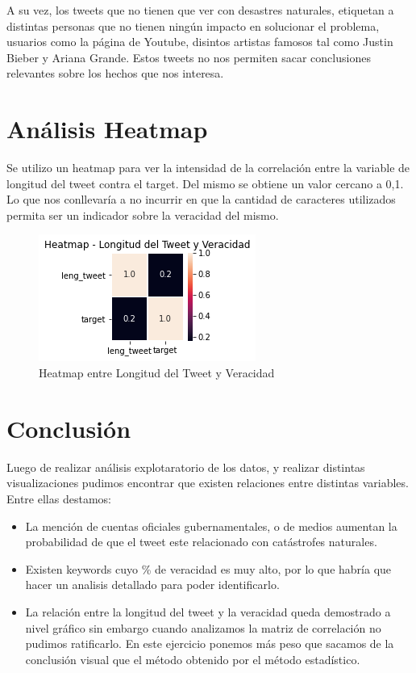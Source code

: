 \documentclass[]{article}
\begin{document}
A su vez, los tweets que no tienen que ver con desastres naturales, etiquetan a distintas personas que no tienen ning\'un impacto en solucionar el problema, usuarios como la p\'agina de Youtube, disintos artistas famosos tal como Justin Bieber y Ariana Grande. Estos tweets no nos permiten sacar conclusiones relevantes sobre los hechos que nos interesa.

\section{An\'alisis Heatmap}

Se utilizo un heatmap para ver la intensidad de la correlación entre la variable  de longitud del tweet contra el target. Del mismo se obtiene un valor cercano a 0,1. Lo que nos conllevaría a no incurrir en que la cantidad de caracteres utilizados permita ser un indicador sobre la veracidad del mismo.

 \begin{figure}[H]
	
	\includegraphics[width=0.70\linewidth]{heatmap}
	\caption[]{Heatmap entre Longitud del Tweet y Veracidad}
\end{figure}

\section{Conclusi\'on}

Luego de realizar an\'alisis explotaratorio de los datos, y realizar distintas visualizaciones pudimos encontrar que existen relaciones entre distintas variables. Entre ellas destamos:
\begin{itemize}
	\item La menci\'on de cuentas oficiales gubernamentales, o de medios aumentan la probabilidad de que el tweet este relacionado con cat\'astrofes naturales.
	\item Existen keywords cuyo \% de veracidad es muy alto, por lo que habr\'ia que hacer un analisis detallado para poder identificarlo. 
	\item La relaci\'on entre la longitud del tweet y la veracidad queda demostrado a nivel gr\'afico sin embargo cuando analizamos la matriz de correlaci\'on no pudimos ratificarlo. En este ejercicio ponemos m\'as peso que sacamos de la conclusi\'on visual que el m\'etodo obtenido por el m\'etodo estad\'istico. 
\end{itemize}
\end{document}
